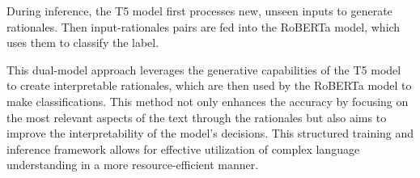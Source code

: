 During inference, the T5 model first processes new, unseen inputs to generate rationales. Then input-rationales pairs are fed into the RoBERTa model, which uses them to classify the label.

This dual-model approach leverages the generative capabilities of the T5 model to create interpretable rationales, which are then used by the RoBERTa model to make classifications. This method not only enhances the accuracy by focusing on the most relevant aspects of the text through the rationales but also aims to improve the interpretability of the model's decisions. This structured training and inference framework allows for effective utilization of complex language understanding in a more resource-efficient manner.
